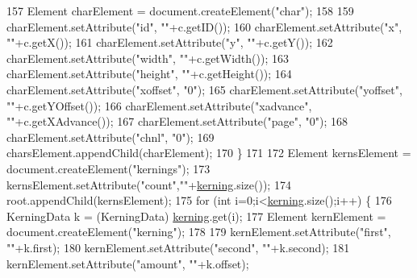 \begin{DoxyCode}
157                 Element charElement = document.createElement(\textcolor{stringliteral}{"char"});
158                 
159                 charElement.setAttribute(\textcolor{stringliteral}{"id"}, \textcolor{stringliteral}{""}+c.getID());
160                 charElement.setAttribute(\textcolor{stringliteral}{"x"}, \textcolor{stringliteral}{""}+c.getX());
161                 charElement.setAttribute(\textcolor{stringliteral}{"y"}, \textcolor{stringliteral}{""}+c.getY());
162                 charElement.setAttribute(\textcolor{stringliteral}{"width"}, \textcolor{stringliteral}{""}+c.getWidth());
163                 charElement.setAttribute(\textcolor{stringliteral}{"height"}, \textcolor{stringliteral}{""}+c.getHeight());
164                 charElement.setAttribute(\textcolor{stringliteral}{"xoffset"}, \textcolor{stringliteral}{"0"});
165                 charElement.setAttribute(\textcolor{stringliteral}{"yoffset"}, \textcolor{stringliteral}{""}+c.getYOffset());
166                 charElement.setAttribute(\textcolor{stringliteral}{"xadvance"}, \textcolor{stringliteral}{""}+c.getXAdvance());
167                 charElement.setAttribute(\textcolor{stringliteral}{"page"}, \textcolor{stringliteral}{"0"});
168                 charElement.setAttribute(\textcolor{stringliteral}{"chnl"}, \textcolor{stringliteral}{"0"});
169                 charsElement.appendChild(charElement);
170             \}
171             
172             Element kernsElement = document.createElement(\textcolor{stringliteral}{"kernings"});
173             kernsElement.setAttribute(\textcolor{stringliteral}{"count"},\textcolor{stringliteral}{""}+\mbox{\hyperlink{classorg_1_1newdawn_1_1slick_1_1tools_1_1hiero_1_1_data_set_a6a34bd71965bd3b2e169755305389ab8}{kerning}}.size());
174             root.appendChild(kernsElement);
175             \textcolor{keywordflow}{for} (\textcolor{keywordtype}{int} i=0;i<\mbox{\hyperlink{classorg_1_1newdawn_1_1slick_1_1tools_1_1hiero_1_1_data_set_a6a34bd71965bd3b2e169755305389ab8}{kerning}}.size();i++) \{
176                 KerningData k = (KerningData) \mbox{\hyperlink{classorg_1_1newdawn_1_1slick_1_1tools_1_1hiero_1_1_data_set_a6a34bd71965bd3b2e169755305389ab8}{kerning}}.get(i);
177                 Element kernElement = document.createElement(\textcolor{stringliteral}{"kerning"});
178                 
179                 kernElement.setAttribute(\textcolor{stringliteral}{"first"}, \textcolor{stringliteral}{""}+k.first);
180                 kernElement.setAttribute(\textcolor{stringliteral}{"second"}, \textcolor{stringliteral}{""}+k.second);
181                 kernElement.setAttribute(\textcolor{stringliteral}{"amount"}, \textcolor{stringliteral}{""}+k.offset);

\end{DoxyCode}
